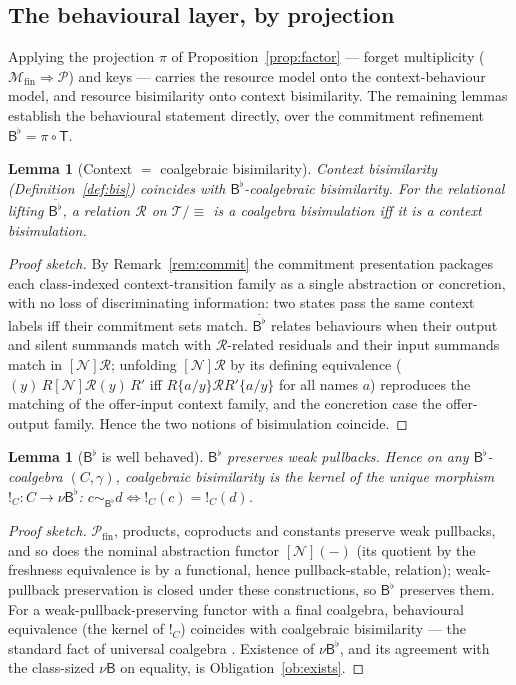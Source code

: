 \documentclass[11pt]{article}
\newcommand{\abs}[2]{(#1)\,#2}                  %
\newcommand{\nset}[1]{[\mathcal{N}]#1}
\newcommand{\Pfin}{\mathcal{P}_{\mathrm{fin}}}
\newcommand{\B}{\mathsf{B}}
\newcommand{\scong}{\equiv}
\newcommand{\Tab}{\mathsf{T}}                  %
\newcommand{\Mfin}{\mathcal{M}_{\mathrm{fin}}} %
\theoremstyle{plain}
\newtheorem{lemma}[theorem]{Lemma}
\theoremstyle{definition}
\begin{document}
\subsection{The behavioural layer, by projection}

Applying the projection $\pi$ of Proposition~\ref{prop:factor} --- forget
multiplicity ($\Mfin\Rightarrow\mathcal P$) and keys --- carries the resource model
onto the context-behaviour model, and resource bisimilarity onto context
bisimilarity. The remaining lemmas establish the behavioural statement directly,
over the commitment refinement $\B^{\flat}=\pi\circ\Tab$.

\begin{lemma}[Context $=$ coalgebraic bisimilarity]\label{lem:oc}
Context bisimilarity (Definition~\ref{def:bis}) coincides with $\B^{\flat}$-coalgebraic
bisimilarity. For the relational lifting $\overline{\B^{\flat}}$, a relation
$\mathcal R$ on $\mathcal T/{\scong}$ is a coalgebra bisimulation iff it is a
context bisimulation.
\end{lemma}
\begin{proof}[Proof sketch]
By Remark~\ref{rem:commit} the commitment presentation packages each class-indexed
context-transition family as a single abstraction or concretion, with no loss of
discriminating information: two states pass the same context labels iff their
commitment sets match. $\overline{\B^{\flat}}$ relates behaviours when their
output and silent summands match with $\mathcal R$-related residuals and their
input summands match in $\nset{\mathcal R}$; unfolding $\nset{\mathcal R}$ by its
defining equivalence ($\abs y R\mathrel{\nset{\mathcal R}}\abs y{R'}$ iff
$R\{a/y\}\mathrel{\mathcal R}R'\{a/y\}$ for all names $a$) reproduces the matching
of the offer-input context family, and the concretion case the offer-output family.
Hence the two notions of bisimulation coincide.
\end{proof}

\begin{lemma}[$\B^{\flat}$ is well behaved]\label{lem:wp}
$\B^{\flat}$ preserves weak pullbacks. Hence on any $\B^{\flat}$-coalgebra
$(C,\gamma)$, coalgebraic bisimilarity is the kernel of the unique morphism
$!_C\colon C\to\nu{\B^{\flat}}$: $c\mathrel{\sim_{\B^{\flat}}}d \iff
{!_C}(c)={!_C}(d)$.
\end{lemma}
\begin{proof}[Proof sketch]
$\Pfin$, products, coproducts and constants preserve weak pullbacks, and so does
the nominal abstraction functor $\nset{(-)}$ (its quotient by the freshness
equivalence is by a functional, hence pullback-stable, relation); weak-pullback
preservation is closed under these constructions, so $\B^{\flat}$ preserves them.
For a weak-pullback-preserving functor with a final coalgebra, behavioural
equivalence (the kernel of $!_C$) coincides with coalgebraic bisimilarity --- the
standard fact of universal coalgebra \cite{rutten}. Existence of $\nu{\B^{\flat}}$,
and its agreement with the class-sized $\nu\B$ on equality, is
Obligation~\ref{ob:exists}.
\end{proof}
\end{document}

